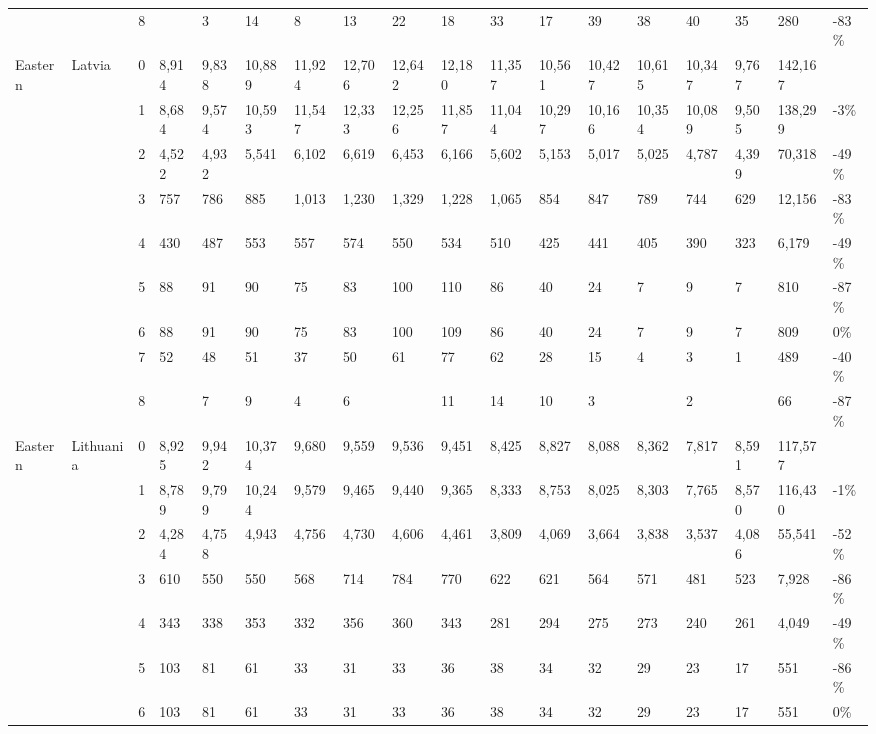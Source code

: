 \begin{longtable}{llllllllllllllllll}
   &  & 8 &  & 3 & 14 & 8 & 13 & 22 & 18 & 33 & 17 & 39 & 38 & 40 & 35 & 280 & -83\% \\ 
  Eastern & Latvia & 0 & 8,914 & 9,838 & 10,889 & 11,924 & 12,706 & 12,642 & 12,180 & 11,357 & 10,561 & 10,427 & 10,615 & 10,347 & 9,767 & 142,167 &  \\ 
   &  & 1 & 8,684 & 9,574 & 10,593 & 11,547 & 12,333 & 12,256 & 11,857 & 11,044 & 10,297 & 10,166 & 10,354 & 10,089 & 9,505 & 138,299 & -3\% \\ 
   &  & 2 & 4,522 & 4,932 & 5,541 & 6,102 & 6,619 & 6,453 & 6,166 & 5,602 & 5,153 & 5,017 & 5,025 & 4,787 & 4,399 & 70,318 & -49\% \\ 
   &  & 3 & 757 & 786 & 885 & 1,013 & 1,230 & 1,329 & 1,228 & 1,065 & 854 & 847 & 789 & 744 & 629 & 12,156 & -83\% \\ 
   &  & 4 & 430 & 487 & 553 & 557 & 574 & 550 & 534 & 510 & 425 & 441 & 405 & 390 & 323 & 6,179 & -49\% \\ 
   &  & 5 & 88 & 91 & 90 & 75 & 83 & 100 & 110 & 86 & 40 & 24 & 7 & 9 & 7 & 810 & -87\% \\ 
   &  & 6 & 88 & 91 & 90 & 75 & 83 & 100 & 109 & 86 & 40 & 24 & 7 & 9 & 7 & 809 & 0\% \\ 
   &  & 7 & 52 & 48 & 51 & 37 & 50 & 61 & 77 & 62 & 28 & 15 & 4 & 3 & 1 & 489 & -40\% \\ 
   &  & 8 &  & 7 & 9 & 4 & 6 &  & 11 & 14 & 10 & 3 &  & 2 &  & 66 & -87\% \\ 
  Eastern & Lithuania & 0 & 8,925 & 9,942 & 10,374 & 9,680 & 9,559 & 9,536 & 9,451 & 8,425 & 8,827 & 8,088 & 8,362 & 7,817 & 8,591 & 117,577 &  \\ 
   &  & 1 & 8,789 & 9,799 & 10,244 & 9,579 & 9,465 & 9,440 & 9,365 & 8,333 & 8,753 & 8,025 & 8,303 & 7,765 & 8,570 & 116,430 & -1\% \\ 
   &  & 2 & 4,284 & 4,758 & 4,943 & 4,756 & 4,730 & 4,606 & 4,461 & 3,809 & 4,069 & 3,664 & 3,838 & 3,537 & 4,086 & 55,541 & -52\% \\ 
   &  & 3 & 610 & 550 & 550 & 568 & 714 & 784 & 770 & 622 & 621 & 564 & 571 & 481 & 523 & 7,928 & -86\% \\ 
   &  & 4 & 343 & 338 & 353 & 332 & 356 & 360 & 343 & 281 & 294 & 275 & 273 & 240 & 261 & 4,049 & -49\% \\ 
   &  & 5 & 103 & 81 & 61 & 33 & 31 & 33 & 36 & 38 & 34 & 32 & 29 & 23 & 17 & 551 & -86\% \\ 
   &  & 6 & 103 & 81 & 61 & 33 & 31 & 33 & 36 & 38 & 34 & 32 & 29 & 23 & 17 & 551 & 0\% \\ 

\end{longtable}
